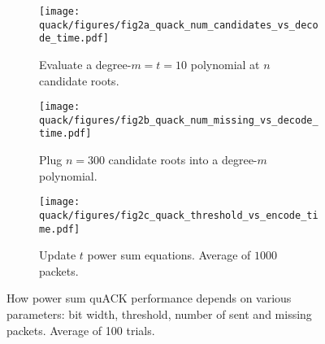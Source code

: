 \begin{figure}[t]
\centering
\begin{subfigure}{0.3\columnwidth}
	\texttt{[image: quack/figures/fig2a\_quack\_num\_candidates\_vs\_decode\_time.pdf]}
	\caption{Evaluate a degree-$m=t=10$ polynomial at $n$ candidate roots.}
	\label{fig:n-vs-decoding}
\end{subfigure}
\hspace{-0.1em}
\begin{subfigure}{0.32\columnwidth}
	\texttt{[image: quack/figures/fig2b\_quack\_num\_missing\_vs\_decode\_time.pdf]}
	\caption{Plug $n=300$ candidate roots into a degree-$m$ polynomial.}
	\label{fig:m-vs-decoding}
\end{subfigure}
\hspace{-0.1em}
\begin{subfigure}{0.32\columnwidth}
	\texttt{[image: quack/figures/fig2c\_quack\_threshold\_vs\_encode\_time.pdf]}
	\caption{Update $t$ power sum equations.
	Average of $1000$ packets.}
	\label{fig:construction-time}
\end{subfigure}
\caption{How power sum quACK performance depends on various parameters:
bit width, threshold, number of sent and missing packets.
Average of 100 trials.
}
\label{fig:quack-plots}
\end{figure}
